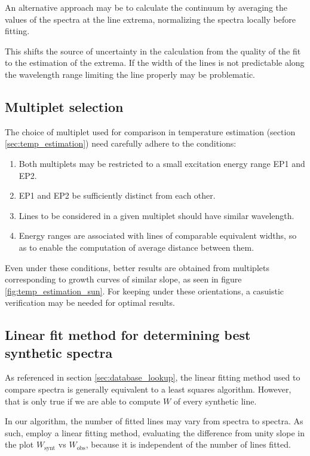 \documentclass{aa}
\begin{document}
An alternative approach may be to calculate the continuum by averaging the
values of the spectra at the line extrema, normalizing the spectra locally
before fitting.

This shifts the source of uncertainty in the calculation from the quality of the
fit to the estimation of the extrema. If the width of the lines is not predictable
along the wavelength range limiting the line properly may be problematic.

\subsection{Multiplet selection}
\label{sec:multiplet_selection}

The choice of multiplet used for comparison in temperature estimation (section
\ref{sec:temp_estimation}) need carefully adhere to the conditions:

\begin{enumerate}
\item Both multiplets may be restricted to a small excitation energy range EP1 and EP2.
\item EP1 and EP2 be sufficiently distinct from each other. 
\item Lines to be considered in a given multiplet should have similar wavelength.
\item Energy ranges are associated with lines of comparable equivalent widths,
  so as to enable the computation of average distance between them.
\end{enumerate}

Even under these conditions, better results are obtained from multiplets corresponding
to growth curves of similar slope, as seen in figure
\ref{fig:temp_estimation_sun}. For keeping under these orientations, a casuistic
verification may be needed for optimal results.


\subsection{Linear fit method for determining best synthetic spectra}

As referenced in section \ref{sec:database_lookup}, the linear fitting method
used to compare spectra is generally equivalent to a least squares algorithm.
However, that is only true if we are able to compute $W$ of every synthetic
line.

In our algorithm, the number of fitted lines may vary from spectra to spectra.
As such, employ a linear fitting method, evaluating the difference from unity slope in
the plot $W_\text{synt}$ vs $W_\text{obs}$, because it is independent of the number of lines fitted.
\end{document}
